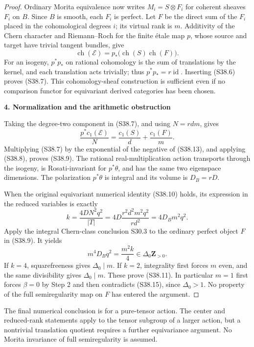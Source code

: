 \begin{proof}
Ordinary Morita equivalence now writes \(M_i=S\otimes F_i\) for coherent sheaves \(F_i\) on \(B\). Since \(B\) is smooth, each \(F_i\) is perfect. Let \(F\) be the direct sum of the \(F_i\) placed in the cohomological degrees \(i\); its virtual rank is \(m\). Additivity of the Chern character and Riemann--Roch for the finite étale map \(p\), whose source and target have trivial tangent bundles, give \[
 \operatorname{ch}(\mathcal E)
    =p_*\bigl(\operatorname{ch}(S)\operatorname{ch}(F)\bigr).
\] For an isogeny, \(p^*p_*\) on rational cohomology is the sum of translations by the kernel, and each translation acts trivially; thus \(p^*p_*=r\operatorname{id}\). Inserting (S38.6) proves (S38.7). This cohomology-sheaf construction is sufficient even if no comparison functor for equivariant derived categories has been chosen.

\par

\medskip\noindent\textbf{4. Normalization and the arithmetic obstruction}\quad

Taking the degree-two component in (S38.7), and using \(N=rdm\), gives \[
 \frac{p^*c_1(\mathcal E)}N
      =\frac{c_1(S)}d+\frac{c_1(F)}m.
 \tag{S38.13}
\] Multiplying (S38.7) by the exponential of the negative of (S38.13), and applying (S38.8), proves (S38.9). The rational real-multiplication action transports through the isogeny, is Rosati-invariant for \(p^*\theta\), and has the same two eigenspace dimensions. The polarization \(p^*\theta\) is integral and its volume is \(D_B=rD\).

When the original equivariant numerical identity (S38.10) holds, its expression in the reduced variables is exactly \[
 k=\frac{4DN^2q^2}{|T|}
   =4D\frac{r^2d^2m^2q^2}{rd^2}
   =4D_Bm^2q^2.
 \tag{S38.14}
\] Apply the integral Chern-class conclusion S30.3 to the ordinary perfect object \(F\) in (S38.9). It yields \[
 m^4D_Bq^2=\frac{m^2k}{4}\in\Delta_0\mathbf Z_{>0}.
 \tag{S38.15}
\] If \(k=4\), squarefreeness gives \(\Delta_0\mid m\). If \(k=2\), integrality first forces \(m\) even, and the same divisibility gives \(\Delta_0\mid m\). These prove (S38.11). In particular \(m=1\) first forces \(\beta=0\) by Step 2 and then contradicts (S38.15), since \(\Delta_0>1\). No property of the full semiregularity map on \(F\) has entered the argument.
\end{proof}
\begin{remark}
The final numerical conclusion is for a pure-tensor action. The center and reduced-rank statements apply to the tensor subgroup of a larger action, but a nontrivial translation quotient requires a further equivariance argument. No Morita invariance of full semiregularity is assumed.\end{remark}
